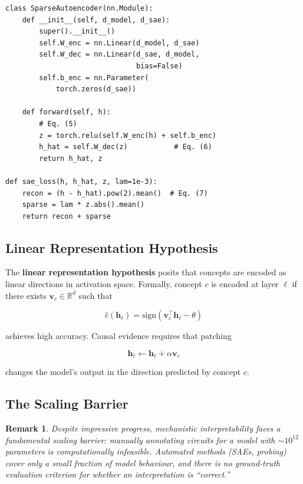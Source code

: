 \documentclass[10pt,twocolumn]{article}
\newtheorem{remark}{Remark}
\begin{document}
\begin{lstlisting}[caption={Sparse autoencoder for mechanistic interpretability.}]
class SparseAutoencoder(nn.Module):
    def __init__(self, d_model, d_sae):
        super().__init__()
        self.W_enc = nn.Linear(d_model, d_sae)
        self.W_dec = nn.Linear(d_sae, d_model,
                               bias=False)
        self.b_enc = nn.Parameter(
            torch.zeros(d_sae))

    def forward(self, h):
        # Eq. (5)
        z = torch.relu(self.W_enc(h) + self.b_enc)
        h_hat = self.W_dec(z)           # Eq. (6)
        return h_hat, z

def sae_loss(h, h_hat, z, lam=1e-3):
    recon = (h - h_hat).pow(2).mean()  # Eq. (7)
    sparse = lam * z.abs().mean()
    return recon + sparse
\end{lstlisting}

\subsection{Linear Representation Hypothesis}

The \textbf{linear representation hypothesis} posits that concepts are
encoded as linear directions in activation space.  Formally, concept
$c$ is encoded at layer $\ell$ if there exists $\mathbf{v}_c \in \mathbb{R}^d$
such that

\begin{equation}
  \hat{c}(\mathbf{h}_\ell) = \text{sign}(\mathbf{v}_c^\top \mathbf{h}_\ell - \theta)
  \label{eq:probe}
\end{equation}

\noindent achieves high accuracy.  Causal evidence requires that patching

\begin{equation}
  \mathbf{h}_\ell \leftarrow \mathbf{h}_\ell + \alpha \mathbf{v}_c
  \label{eq:patch}
\end{equation}

\noindent changes the model's output in the direction predicted by concept $c$.

\subsection{The Scaling Barrier}

\begin{remark}
Despite impressive progress, mechanistic interpretability faces a
fundamental scaling barrier: manually annotating circuits for a model
with $\sim 10^{12}$ parameters is computationally infeasible.
Automated methods (SAEs, probing) cover only a small fraction of
model behaviour, and there is no ground-truth evaluation criterion
for whether an interpretation is ``correct.''
\end{remark}
\end{document}
